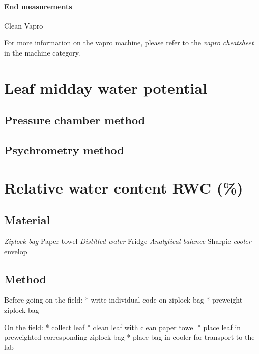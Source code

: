 \documentclass[
  12pt,
  american,
  a4paper,
  extrafontsizes,onecolumn,openright
  ]{memoir}
\begin{document}
\hypertarget{end-measurements}{%
\paragraph{End measurements}\label{end-measurements}}

Clean Vapro

For more information on the vapro machine, please refer to the \emph{vapro cheatsheet} in the machine category.

\hypertarget{leaf-midday-water-potential}{%
\section{Leaf midday water potential}\label{leaf-midday-water-potential}}

\hypertarget{pressure-chamber-method}{%
\subsection{Pressure chamber method}\label{pressure-chamber-method}}

\hypertarget{psychrometry-method}{%
\subsection{Psychrometry method}\label{psychrometry-method}}

\hypertarget{relative-water-content-rwc}{%
\section{Relative water content RWC (\%)}\label{relative-water-content-rwc}}

\hypertarget{material}{%
\subsection{Material}\label{material}}

\emph{Ziplock bag
}Paper towel
\emph{Distilled water
}Fridge
\emph{Analytical balance
}Sharpie
\emph{cooler
}envelop

\hypertarget{method}{%
\subsection{Method}\label{method}}

Before going on the field:
* write individual code on ziplock bag
* preweight ziplock bag

On the field:
* collect leaf
* clean leaf with clean paper towel
* place leaf in preweighted corresponding ziplock bag
* place bag in cooler for transport to the lab
\end{document}
